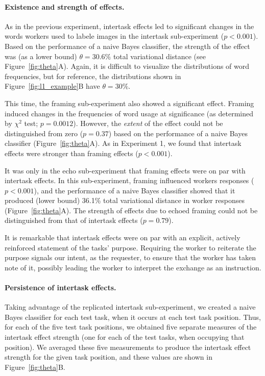 \documentclass{sigchi}
\begin{document}
\paragraph{Existence and strength of effects.}
As in the previous experiment, intertask effects led to significant 
changes in the words workers used to labele images in the intertask 
sub-experiment ($p<0.001$).  Based on
the performance of a naive Bayes classifier, the strength of the effect 
was (as a lower bound) $\theta=30.6\%$ total variational distance
(see Figure~\ref{fig:theta}A).  Again, it is difficult to visualize the 
distributions of word frequencies, but for reference, the distributions 
shown in Figure~\ref{fig:l1_example}B have $\theta = 30\%$.  

This time, the framing sub-experiment also showed a significant effect.
Framing induced changes in the frequencies of word usage at significance 
(as determined by $\chi^2$ test; $p=0.0012$).  However, 
the \textit{extent} of the effect could not be distinguished from zero
($p =0.37$) based on the performance of a naive Bayes classifier 
(Figure~\ref{fig:theta}A).
As in Experiment 1, we found that intertask effects were stronger than
framing effects ($p<0.001$).

It was only in the echo sub-experiment that framing effects were on par 
with intertask effects.  In this sub-experiment, framing influenced 
workers responses ($p<0.001$), and the performance of a naive 
Bayes classifier showed that it produced (lower bound) 36.1\% total 
variational distance in worker responses (Figure~\ref{fig:theta}A).  The
strength of effects due to echoed framing could not be distinguished
from that of intertask effects ($p=0.79$).

It is remarkable that intertask effects were on par with an explicit, 
actively reinforced statement of the tasks' purpose.
Requiring the worker to reiterate the purpose signals our intent, as the 
requester, to ensure that the worker has taken note of it, 
possibly leading the worker to interpret the exchange as an instruction.  

\paragraph{Persistence of intertask effects.} 
Taking advantage of the replicated intertask sub-experiment, we created
a naive Bayes classifier for each test task, when it occurs at each test 
task position.  
Thus, for each of the five test task positions, we obtained 
five separate measures of the intertask effect strength (one for each of 
the test tasks, when occupying that position).  We averaged these five 
measurements to produce the intertask effect strength for the given task
position, and these values are shown in Figure~\ref{fig:theta}B.
\end{document}
